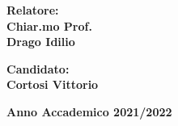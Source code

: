 \begin{titlepage}
\begin{minipage}[t]{0.47\textwidth}
{\large{\bf Relatore:\\
Chiar.mo Prof.\\
Drago Idilio}}
\vspace{8mm}
\end{minipage}
\hfill
\begin{minipage}[t]{0.47\textwidth}\raggedleft
\vspace{20mm}
{\large{\bf Candidato:\\
Cortosi Vittorio}}
\end{minipage}
\vspace{10mm}
\begin{center}
{\large{\bf 
Anno Accademico 2021/2022}}
\end{center}

\end{titlepage}
\newpage\null\thispagestyle{empty}\newpage

